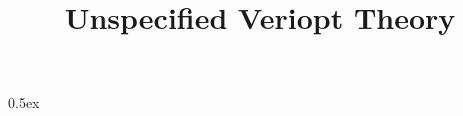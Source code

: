 \documentclass[11pt,a4paper]{article}
\begin{document}
\title{Unspecified Veriopt Theory}
\maketitle

\tableofcontents

\parindent 0pt\parskip 0.5ex



%
%
\end{document}
